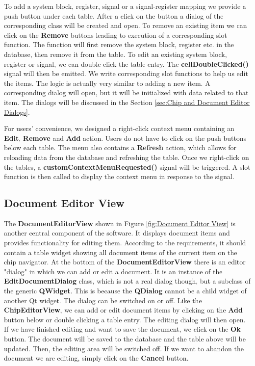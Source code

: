 To add a system block, register, signal or a signal-register mapping we provide a push button under each table. After a click on the button a dialog of the corresponding class will be created and open. To remove an existing item we can click on the \textbf{Remove} buttons leading to execution of a corresponding slot function. The function will first remove the system block, register etc. in the database, then remove it from the table. To edit an existing system block, register or signal, we can double click the table entry. The \textbf{cellDoubleClicked()} signal will then be emitted. We write corresponding slot functions to help us edit the items. The logic is actually very similar to adding a new item. A corresponding dialog will open, but it will be initialized with data related to that item. The dialogs will be discussed in the Section \ref{sec:Chip and Document Editor Dialogs}. 

For users' convenience, we designed a right-click context menu containing an \textbf{Edit}, \textbf{Remove} and \textbf{Add} action. Users do not have to click on the push buttons below each table. The menu also contains a \textbf{Refresh} action, which allows for reloading data from the database and refreshing the table. Once we right-click on the tables, a \textbf{customContextMenuRequested()} signal will be triggered. A slot function is then called to display the context menu in response to the signal.

\subsection{Document Editor View}
The \textbf{DocumentEditorView} shown in Figure \ref{fig:Document Editor View} is another central component of the software. It displays document items and provides functionality for editing them. According to the requirements, it should contain a table widget showing all document items of the current item on the chip navigator. At the bottom of the \textbf{DocumentEditorView} there is an editor "dialog" in which we can add or edit a document. It is an instance of the \textbf{EditDocumentDialog} class, which is not a real dialog though, but a subclass of the generic \textbf{QWidget}. This is because the \textbf{QDialog} cannot be a child widget of another Qt widget. The dialog can be switched on or off. Like the \textbf{ChipEditorView}, we can add or edit document items by clicking on the \textbf{Add} button below or double clicking a table entry. The editing dialog will then open. If we have finished editing and want to save the document, we click on the \textbf{Ok} button. The document will be saved to the database and the table above will be updated. Then, the editing area will be switched off. If we want to abandon the document we are editing, simply click on the \textbf{Cancel} button. 

